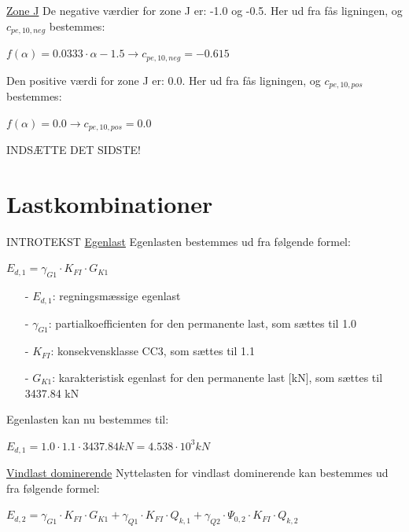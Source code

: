 \underline{Zone J}
\newline
De negative værdier for zone J er: -1.0 og -0.5. Her ud fra fås ligningen, og $c_{pe,10,neg}$ bestemmes:
\begin{center}
	$f(\alpha)=0.0333\cdot \alpha - 1.5 \to c_{pe,10,neg}=-0.615$
\end{center}
Den positive værdi for zone J er: 0.0. Her ud fra fås ligningen, og $c_{pe,10,pos}$ bestemmes:
\begin{center}
	$f(\alpha)=0.0 \to c_{pe,10,pos}=0.0$
\end{center}
INDSÆTTE DET SIDSTE!

\section{Lastkombinationer}
INTROTEKST
\newline
\newline
\underline{Egenlast}
\newline
Egenlasten bestemmes ud fra følgende formel:
\begin{center}
	$E_{d,1}=\gamma_{G1}\cdot K_{FI}\cdot G_{K1}$
\end{center}
\begin{itemize}
	\item[-] $E_{d,1}$: regningsmæssige egenlast
	\item[-] $\gamma_{G1}$: partialkoefficienten for den permanente last, som sættes til 1.0 \citep[ tabel A 1.2(B+C) anneks A.1.3.1]{EU90}
	\item[-] $K_{FI}$: konsekvensklasse CC3, som sættes til 1.1 \citep[ tabel A 1.2(A) anneks A.1.3.1]{EU90}
	\item[-] $G_{K1}$: karakteristisk egenlast for den permanente last [kN], som sættes til 3437.84 kN
\end{itemize}
Egenlasten kan nu bestemmes til:
\begin{center}
	$E_{d,1}=1.0\cdot 1.1\cdot 3437.84 kN=4.538\cdot 10^3 kN$
\end{center}
\underline{Vindlast dominerende}
\newline
Nyttelasten for vindlast dominerende kan bestemmes ud fra følgende formel:
\begin{center}
	$E_{d,2}=\gamma_{G1}\cdot K_{FI}\cdot G_{K1}+\gamma_{Q1}\cdot K_{FI}\cdot Q_{k,1}+\gamma_{Q2}\cdot \Psi_{0,2}\cdot K_{FI}\cdot Q_{k,2}$
\end{center}
